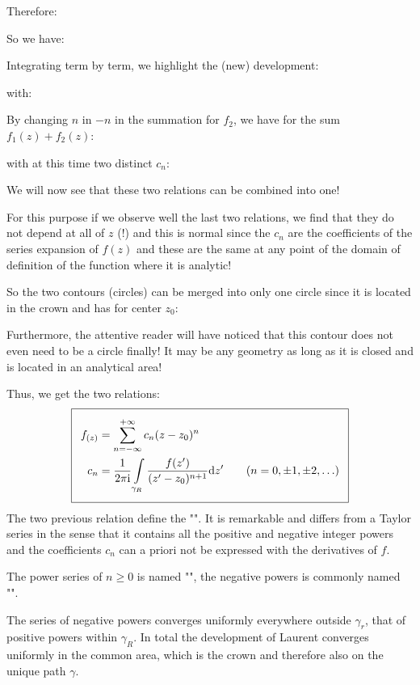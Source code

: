 	Therefore:
	
	So we have:
	
	Integrating term by term, we highlight the (new) development:
	
	with:
	
	By changing $n$ in $-n$ in the summation for $f_2$, we have for the sum $f_1(z)+f_2(z)$:
	
	with at this time two distinct $c_n$:
	
	We will now see that these two relations can be combined into one!
	
	For this purpose if we observe well the last two relations, we find that they do not depend at all of $z$ (!) and this is normal since the $c_n$ are the coefficients of the series expansion of $f(z)$ and these are the same at any point of the domain of definition of the function where it is analytic!
	
	So the two contours (circles) can be merged into only one circle since it is located in the crown and has for center $z_0$:
	
	Furthermore, the attentive reader will have noticed that this contour does not even need to be a circle finally! It may be any geometry as long as it is closed and is located in an analytical area!
	
	Thus, we get the two relations:
	\begin{equation}
  \addtolength{\fboxsep}{5pt}
   \boxed{
   \begin{gathered}
   		\begin{aligned}
		f_{(z)}&=\sum_{n=-\infty}^{+\infty} c_n(z-z_0)^n\\
		c_n&=\dfrac{1}{2\pi\mathrm{i}}\int\limits_{\gamma_R} \dfrac{f(z')}{(z'-z_0)^{n+1}}\mathrm{d}z' \qquad (n=0,\pm 1,\pm 2, \ldots )
   		\end{aligned}
   \end{gathered}
   }
	\end{equation}
	The two previous relation define the "". It is remarkable and differs from a Taylor series in the sense that it contains all the positive and negative integer powers and the coefficients $c_n$ can a priori not be expressed with the derivatives of $f$.
	
	The power series of $n\geq 0$ is named "", the negative powers is commonly named "".
	
	The series of negative powers converges uniformly everywhere outside $\gamma_r$, that of positive powers within $\gamma_R$. In total the development of Laurent converges uniformly in the common area, which is the crown and therefore also on the unique path $\gamma$.
	
